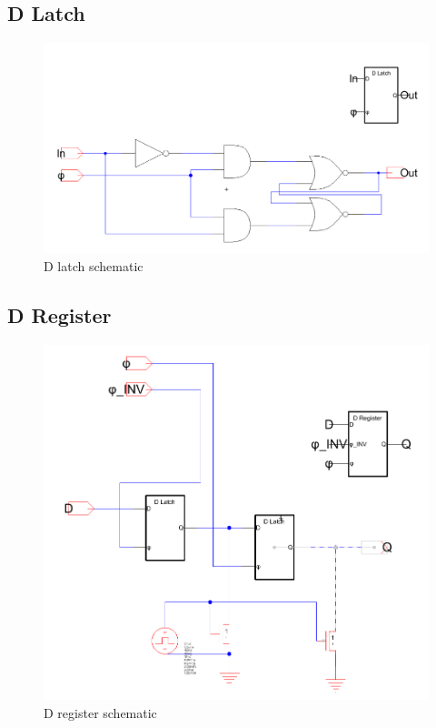 \documentclass[12pt]{report}
\begin{document}
\subsection*{D Latch}
\begin{figure}[H]
  \centering
    \includegraphics[width=1.0\textwidth]{Schematics/d_latch_schematic.PNG}
  \caption{D latch schematic}
  \label{fig:d_latch_schematic}
\end{figure}

\subsection*{D Register}
\begin{figure}[H]
  \centering
    \includegraphics[width=1.0\textwidth]{Schematics/d_register_schematic.PNG}
  \caption{D register schematic}
  \label{fig:d_register_schematic}
\end{figure}
\end{document}
